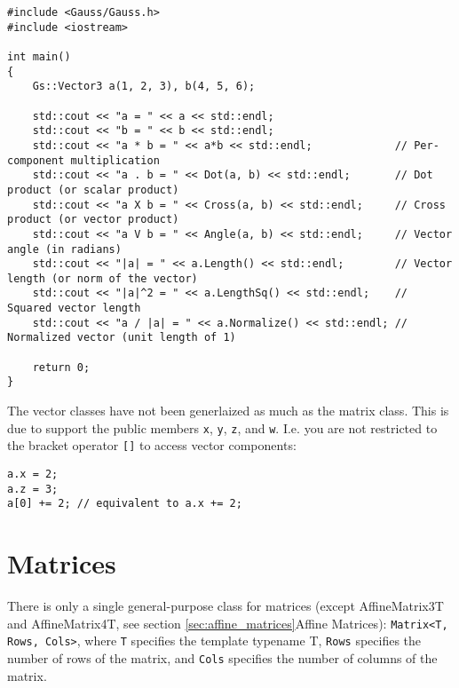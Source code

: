 \documentclass{article}
\begin{document}
\begin{lstlisting}
#include <Gauss/Gauss.h>
#include <iostream>

int main()
{
	Gs::Vector3 a(1, 2, 3), b(4, 5, 6);
	
	std::cout << "a = " << a << std::endl;
	std::cout << "b = " << b << std::endl;
	std::cout << "a * b = " << a*b << std::endl;             // Per-component multiplication
	std::cout << "a . b = " << Dot(a, b) << std::endl;       // Dot product (or scalar product)
	std::cout << "a X b = " << Cross(a, b) << std::endl;     // Cross product (or vector product)
	std::cout << "a V b = " << Angle(a, b) << std::endl;     // Vector angle (in radians)
	std::cout << "|a| = " << a.Length() << std::endl;        // Vector length (or norm of the vector)
	std::cout << "|a|^2 = " << a.LengthSq() << std::endl;    // Squared vector length
	std::cout << "a / |a| = " << a.Normalize() << std::endl; // Normalized vector (unit length of 1)
	
	return 0;
}
\end{lstlisting}
The vector classes have not been generlaized as much as the matrix class. This is due to support the public members
\texttt{x}, \texttt{y}, \texttt{z}, and \texttt{w}. I.e. you are not restricted to the bracket operator \texttt{[]}
to access vector components:
\begin{lstlisting}
a.x = 2;
a.z = 3;
a[0] += 2; // equivalent to a.x += 2;
\end{lstlisting}



\section*{Matrices}

There is only a single general-purpose class for matrices
(except AffineMatrix3T and AffineMatrix4T, see section \ref{sec:affine_matrices}{Affine Matrices}):
\texttt{Matrix<T, Rows, Cols>}, where \texttt{T} specifies the template typename T, \texttt{Rows} specifies the
number of rows of the matrix, and \texttt{Cols} specifies the number of columns of the matrix.
\end{document}
